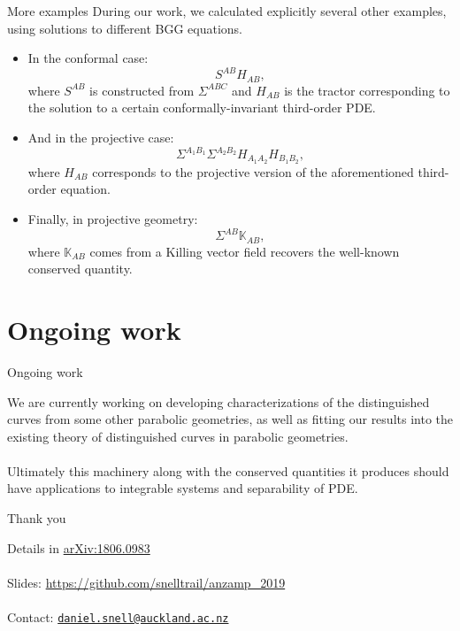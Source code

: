 \documentclass{beamer}
\begin{document}
\begin{frame}{More examples}
  During our work, we calculated explicitly several other examples, using
  solutions to different BGG equations.\\
  \begin{itemize}
    \pause
    \item In the conformal case:
      \[
      S^{AB} H_{AB},
      \]
      where \( S^{AB} \) is constructed from \( \Sigma^{ABC} \) and
      \( H_{AB} \) is the tractor corresponding to the solution to a certain
      conformally-invariant third-order PDE.
    \pause
    \item And in the projective case:
      \[
        \Sigma^{A_1 B_1} \Sigma^{A_2 B_2} H_{A_1
        A_2} H_{B_1 B_2},
      \]
      where \( H_{A B} \) corresponds to the projective version of the
      aforementioned third-order equation.\\
      \pause
    \item Finally, in projective geometry:
      \[
        \Sigma^{A B} \mathbb{K}_{A B},
      \]
      where \( \mathbb{K}_{A B} \) comes from a Killing vector field recovers the well-known conserved quantity.
  \end{itemize}
\end{frame}

\section{Ongoing work}

\begin{frame}{Ongoing work}
  \begin{block}{}
    We are currently working on developing characterizations of the distinguished curves from some other parabolic geometries, as well as fitting our results into the existing theory of distinguished curves in parabolic geometries. \\
    \hspace{1em}\\
    \pause
    Ultimately this machinery along with the conserved quantities it produces should have applications to integrable systems and separability of PDE.
  \end{block}
\end{frame}

\begin{frame}{Thank you}
  \begin{block}{}
  Details in \href{https://arxiv.org/abs/1806.09830}{arXiv:1806.0983}\\
  \hspace{1em}\\
  Slides:
  \href{https://github.com/snelltrail/anzamp_2019}{https://github.com/snelltrail/anzamp\_2019}\\
  \hspace{1em}\\
  Contact: \texttt{\href{mailto:daniel.snell@auckland.ac.nz}{daniel.snell@auckland.ac.nz}}
  \end{block}
\end{frame}
\end{document}
